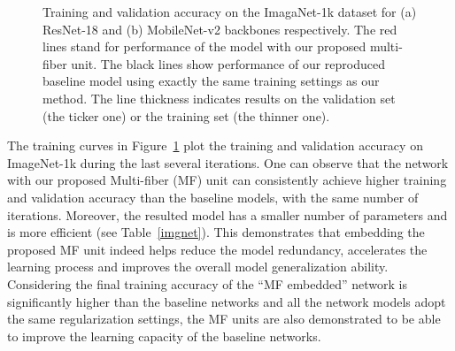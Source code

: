 \documentclass[runningheads]{llncs}
\newcommand{\ourslong}[0]{multi-fiber\xspace}
\begin{document}
\begin{figure}
\centering
{}
\caption{Training and validation accuracy on the ImagaNet-1k dataset for (a) ResNet-18 and (b) MobileNet-v2 backbones respectively. The red lines stand for performance of the model with our proposed \ourslong unit. The black lines show performance of our reproduced baseline model using exactly the same training settings as our method. The line thickness indicates results on the validation set (the ticker one) or the training set (the thinner one).}
\label{fig_imnet_curve}
\end{figure}
The training curves in Figure~\ref{fig_imnet_curve} plot the training and validation accuracy on ImageNet-1k during the last several  iterations. One can observe that the network with our proposed Multi-fiber (MF) unit can consistently achieve higher training and validation accuracy than the baseline
models, with the same number of iterations.  Moreover, the resulted model has a smaller number of parameters and is more efficient (see Table~\ref{imgnet}).  This demonstrates that  embedding the proposed MF unit indeed helps reduce the model redundancy, accelerates the learning process and improves the overall model generalization ability. Considering the final training accuracy of the ``MF embedded'' network is significantly higher than the baseline networks and all the network models adopt the same regularization settings, the MF units are also demonstrated to be able to improve the learning capacity of the baseline networks.
\end{document}
